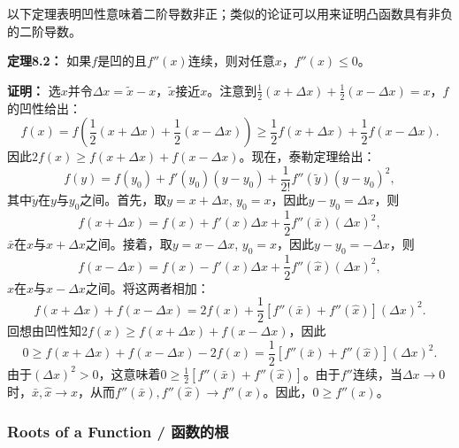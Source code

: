 \begin{translation}
以下定理表明凹性意味着二阶导数非正；类似的论证可以用来证明凸函数具有非负的二阶导数。

\textbf{定理8.2：} 如果$f$是凹的且$f''(x)$连续，则对任意$x$，$f''(x) \le 0$。

\textbf{证明：} 选$x$并令$\Delta x = \tilde{x} - x$，$\tilde{x}$接近$x$。注意到$\frac{1}{2}(x + \Delta x) + \frac{1}{2}(x - \Delta x) = x$，$f$的凹性给出：
\[
f(x) = f\!\left(\frac{1}{2}(x + \Delta x) + \frac{1}{2}(x - \Delta x)\right) \ge \frac{1}{2}f(x + \Delta x) + \frac{1}{2}f(x - \Delta x).
\]
因此$2f(x) \ge f(x + \Delta x) + f(x - \Delta x)$。现在，泰勒定理给出：
\[
f(y) = f(y_0) + f'(y_0)(y - y_0) + \frac{1}{2!}f''(\tilde{y})(y - y_0)^2,
\]
其中$\tilde{y}$在$y$与$y_0$之间。首先，取$y = x + \Delta x$, $y_0 = x$，因此$y - y_0 = \Delta x$，则
\[
f(x + \Delta x) = f(x) + f'(x)\Delta x + \frac{1}{2}f''(\bar{x})(\Delta x)^2,
\]
$\bar{x}$在$x$与$x + \Delta x$之间。接着，取$y = x - \Delta x$, $y_0 = x$，因此$y - y_0 = -\Delta x$，则
\[
f(x - \Delta x) = f(x) - f'(x)\Delta x + \frac{1}{2}f''(\hat{x})(\Delta x)^2,
\]
$\hat{x}$在$x$与$x - \Delta x$之间。将这两者相加：
\[
f(x + \Delta x) + f(x - \Delta x) = 2f(x) + \frac{1}{2}[f''(\bar{x}) + f''(\hat{x})](\Delta x)^2.
\]
回想由凹性知$2f(x) \ge f(x + \Delta x) + f(x - \Delta x)$，因此
\[
0 \ge f(x + \Delta x) + f(x - \Delta x) - 2f(x) = \frac{1}{2}[f''(\bar{x}) + f''(\hat{x})](\Delta x)^2.
\]
由于$(\Delta x)^2 > 0$，这意味着$0 \ge \frac{1}{2}[f''(\bar{x}) + f''(\hat{x})]$。由于$f''$连续，当$\Delta x \to 0$时，$\bar{x}, \hat{x} \to x$，从而$f''(\bar{x}), f''(\hat{x}) \to f''(x)$。因此，$0 \ge f''(x)$。
\end{translation}

\subsubsection{Roots of a Function / 函数的根}

